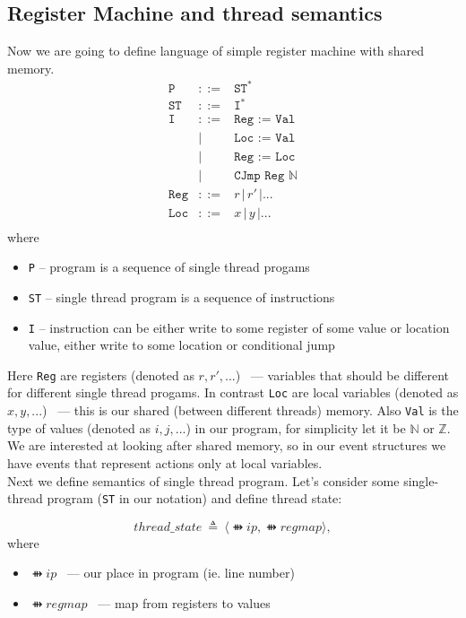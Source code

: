 \subsection{Register Machine and thread semantics}
Now we are going to define language of simple register machine with shared memory.
\newcommand{\ip}{\ffun{ip}}
\newcommand{\regmap}{\ffun{regmap}}
\newcommand{\la}{\langle}
\newcommand{\ra}{\rangle}
\[
\begin{array}{rcll}
  \texttt{P} &::=& \texttt{ST}^* \\
  \texttt{ST} & ::= & \texttt{I}^* \\
  \texttt{I} & ::= & \texttt{Reg := Val} \\
                 & | & \texttt{Loc := Val} \\
                 & | & \texttt{Reg := Loc} \\
                 & | & \texttt{CJmp Reg $\mathbb{N}$} \\
  \texttt{Reg}            & ::= & r \, | \, r' \, | ... \\ 
  \texttt{Loc}            & ::= & x \, | \,y \,| ... \\ 
\end{array}
\] where
\begin{itemize}
  \item \texttt{P} -- program is a sequence of single thread progams
  \item \texttt{ST} -- single thread program is a sequence of instructions
  \item \texttt{I} -- instruction can be either write to some register of some value or location value, either write to some location or conditional jump
\end{itemize}
Here \texttt{Reg} are registers (denoted as $r,r',...$) ~--- variables that should be different for different single thread progams. In contrast \texttt{Loc} are local variables (denoted as $x,y,...$) ~--- this is our shared (between different threads) memory. Also \texttt{Val} is the type of values (denoted as $i,j,...$) in our program, for simplicity let it be $\mathbb{N}$ or $\mathbb{Z}$. \\
We are interested at looking after shared memory, so in our event structures we have events that represent actions only at local variables. \\
Next we define semantics of single thread program. Let's consider some single-thread program (\texttt{ST} in our notation) and define thread state:
\begin{definition}
  $$thread\_state \ \triangleq \ \langle \ffun{ip}, \ffun{regmap} \rangle,$$ where
  \begin{itemize}
    \item $\ffun{ip}$ ~--- our place in program (ie. line number) 
    \item $\ffun{regmap}$ ~--- map from registers to values
  \end{itemize}
\end{definition}

